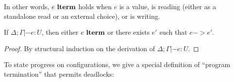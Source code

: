 In other words, $e~\textbf{lterm}$ holds when $e$ is a value, is reading (either as a
standalone read or an external choice), or is writing.

\begin{lemma}
  If $\Delta; \Gamma|- e : U$, then either $e~\textbf{lterm}$
  or there exists $e'$ such that $e -> e'$.
  \begin{proof}
    By structural induction on the derivation of $\Delta ; \Gamma|- e : U$.
  \end{proof}
\end{lemma}

To state progress on configurations, we give a special definition of ``program
termination'' that permits deadlocks:\smallskip

